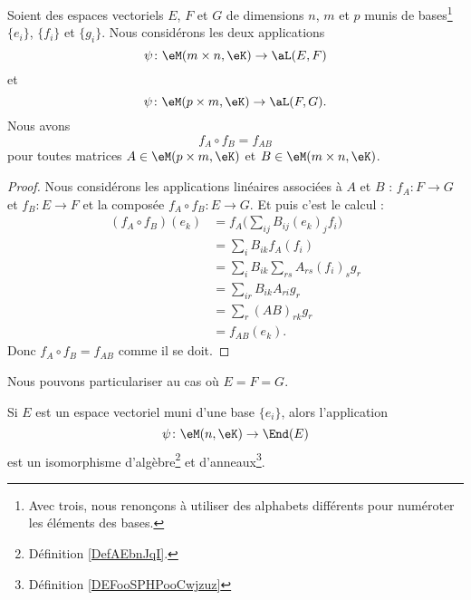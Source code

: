 \begin{proposition}     \label{PROPooCSJNooEqcmFm}
    Soient des espaces vectoriels \( E\), \( F\) et \( G\) de dimensions \( n\), \( m\) et \( p\) munis de bases\footnote{Avec trois, nous renonçons à utiliser des alphabets différents pour numéroter les éléments des bases.} \( \{ e_i \}\), \( \{ f_i \}\) et \( \{ g_i \}\). Nous considérons les deux applications
    \begin{equation}
        \psi\colon \eM(m\times n,\eK)\to \aL(E,F)
    \end{equation}
    et
    \begin{equation}
        \psi\colon \eM(p\times m,\eK)\to \aL(F,G).
    \end{equation}
    Nous avons 
    \begin{equation}
        f_A\circ f_B=f_{AB}
    \end{equation}
    pour toutes matrices \( A\in \eM(p\times m,\eK)\) et \( B\in \eM(m\times n,\eK)\).
\end{proposition}

\begin{proof}
    Nous considérons les applications linéaires associées à \( A\) et \( B\) : \( f_A\colon F\to G\) et \( f_B\colon E\to F\) et la composée \( f_A\circ f_B\colon E\to G\). Et puis c'est le calcul :
    \begin{subequations}
        \begin{align}
            (f_A\circ f_B)(e_k)&=f_A\big( \sum_{ij}B_{ij}(e_k)_jf_i \big)\\
            &=\sum_i B_{ik}f_A(f_i)\\
            &=\sum_iB_{ik}\sum_{rs}A_{rs}(f_i)_sg_r\\
            &=\sum_{ir}B_{ik}A_{ri}g_r\\
            &=\sum_r(AB)_{rk}g_r\\
            &=f_{AB}(e_k).
        \end{align}
    \end{subequations}
    Donc \( f_A\circ f_B=f_{AB}\) comme il se doit.
\end{proof}
    
Nous pouvons particulariser au cas où \( E=F=G\).
\begin{proposition}     \label{PROPooFMBFooEVCLKA}
    Si \( E\) est un espace vectoriel muni d'une base \( \{ e_i \}\), alors l'application
    \begin{equation}
        \psi\colon \eM(n,\eK)\to \End(E)
    \end{equation}
    est un isomorphisme d'algèbre\footnote{Définition \ref{DefAEbnJqI}.} et d'anneaux\footnote{Définition \ref{DEFooSPHPooCwjzuz}}.
\end{proposition}

